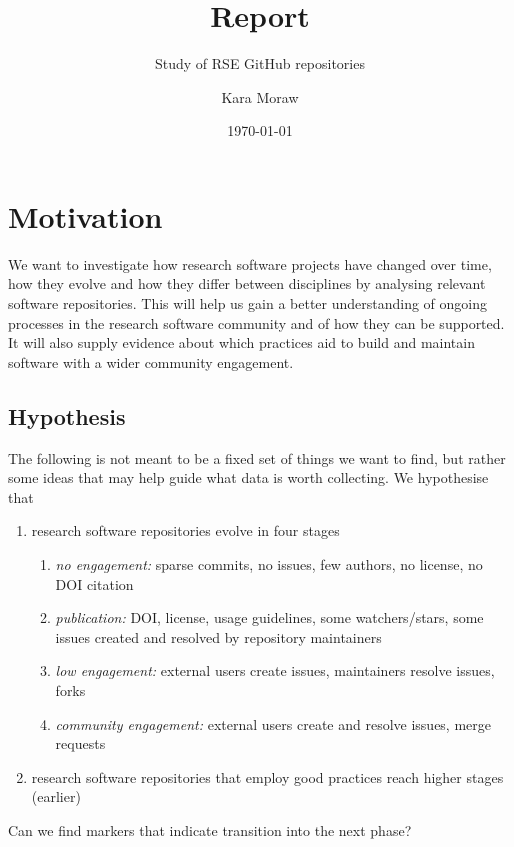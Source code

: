 \documentclass[10pt,a4paper]{scrartcl}
\begin{document}
\title{Report}
\subtitle{Study of RSE GitHub repositories}
\author{Kara Moraw}
\date{\today}
\maketitle

\section*{Motivation}

We want to investigate how research software projects have changed over time, how they evolve and how they differ between disciplines by analysing relevant software repositories.
This will help us gain a better understanding of ongoing processes in the research software community and of how they can be supported.
It will also supply evidence about which practices aid to build and maintain software with a wider community engagement.

\subsection*{Hypothesis}

The following is not meant to be a fixed set of things we want to find, but rather some ideas that may help guide what data is worth collecting.
We hypothesise that
\begin{enumerate}
    \item research software repositories evolve in four stages
    \begin{enumerate}
        \item \textit{no engagement:} sparse commits, no issues, few authors, no license, no DOI citation
        \item \textit{publication:} DOI, license, usage guidelines, some watchers/stars, some issues created and resolved by repository maintainers
        \item \textit{low engagement:} external users create issues, maintainers resolve issues, forks
        \item \textit{community engagement:} external users create and resolve issues, merge requests
    \end{enumerate}
    \item research software repositories that employ good practices reach higher stages (earlier)
\end{enumerate}

Can we find markers that indicate transition into the next phase?
\end{document}

